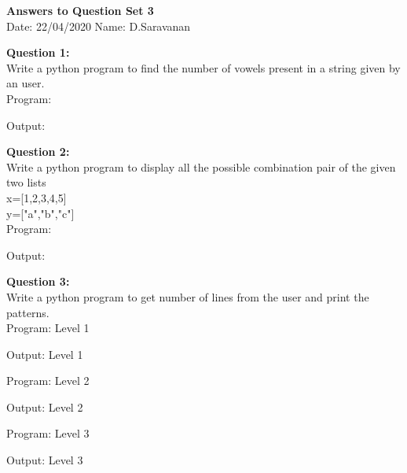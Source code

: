 \documentclass[a4paper,11pt,openright]{report}
\begin{document}
\singlespacing
\pagestyle{plain}

\begin{center}
\textbf{Answers to Question Set 3} \\
Date: 22/04/2020 \hspace{2mm} Name: D.Saravanan
\end{center}

\textbf{Question 1:} \\
Write a python program to find the number of vowels present in a string given by an user. \\

Program: 


\vspace{5px}

Output:


\vspace{30px}

\textbf{Question 2:} \\
Write a python program to display all the possible combination pair of the given two lists\\
x=[1,2,3,4,5]\\
y=["a","b","c"] \\

Program:


\vspace{5px}

Output:


\vspace{30px}

\textbf{Question 3:} \\
Write a python program to get number of lines from the user and print the patterns. \\

Program: Level 1


\vspace{5px}

Output: Level 1


\vspace{5px}

\pagebreak

Program: Level 2


\vspace{5px}

Output: Level 2


\vspace{5px}

Program: Level 3


\vspace{5px}

Output: Level 3

\end{document}
